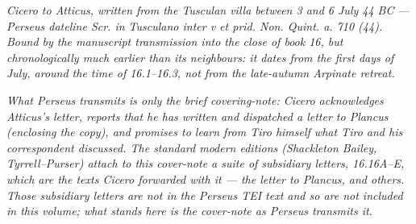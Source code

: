 
\textit{Cicero to Atticus, written from the Tusculan villa
between 3 and 6 July 44 BC --- Perseus dateline
\textit{Scr. in Tusculano inter v et prid. Non. Quint. a. 710
(44)}. Bound by the manuscript transmission into the close of
book 16, but chronologically much earlier than its
neighbours: it dates from the first days of July, around the
time of 16.1--16.3, not from the late-autumn Arpinate
retreat.}

\textit{What Perseus transmits is only the brief
covering-note: Cicero acknowledges Atticus's letter, reports
that he has written and dispatched a letter to Plancus
(enclosing the copy), and promises to learn from Tiro himself
what Tiro and his correspondent discussed. The standard
modern editions (Shackleton Bailey, Tyrrell--Purser) attach to
this cover-note a suite of subsidiary letters, 16.16A--E,
which are the texts Cicero forwarded with it --- the letter
to Plancus, and others. Those subsidiary letters are not in
the Perseus TEI text and so are not included in this volume;
what stands here is the cover-note as Perseus transmits it.}
